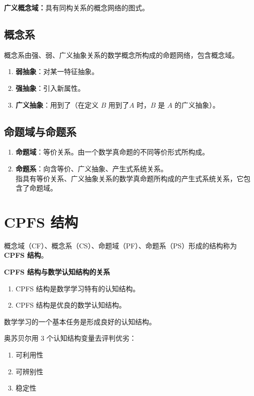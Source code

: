 \textbf{广义概念域：}具有同构关系的概念网络的图式。

\subsection{概念系}

概念系由强、弱、广义抽象关系的数学概念所构成的命题网络，包含概念域。

\begin{enumerate}
    \item \textbf{弱抽象}：对某一特征抽象。
    \item \textbf{强抽象}：引入新属性。
    \item \textbf{广义抽象}：用到了（在定义 $B$ 用到了$A$ 时，$B$ 是 $A$ 的广义抽象）。
\end{enumerate}

\subsection{命题域与命题系}

\begin{enumerate}
    \item \textbf{命题域}：等价关系。由一个数学真命题的不同等价形式所构成。
    \item \textbf{命题系}：向含等价、广义抽象、产生式系统关系。\\
    指具有等价关系、广义抽象关系的数学真命题所构成的产生式系统关系，它包含了命题域。
\end{enumerate}


\section{CPFS 结构}

\begin{multicols}{2}

概念域（CF）、概念系（CS）、命题域（PF）、命题系（PS）形成的结构称为 \textbf{CPFS 结构}。

\textbf{CPFS 结构与数学认知结构的关系}
\begin{enumerate}
    \item CPFS 结构是数学学习特有的认知结构。
    \item CPFS 结构是优良的数学认知结构。
\end{enumerate}

\columnbreak

数学学习的一个基本任务是形成良好的认知结构。

奥苏贝尔用 3 个认知结构变量去评判优劣：
\begin{enumerate}
    \item 可利用性
    \item 可辨别性
    \item 稳定性
\end{enumerate}

\end{multicols}

